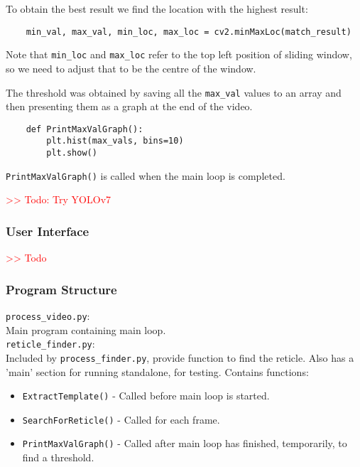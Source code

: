 \documentclass[final]{cmpreport_02}
\begin{document}
To obtain the best result we find the location with the highest result:
\begin{verbatim}
	min_val, max_val, min_loc, max_loc = cv2.minMaxLoc(match_result)
\end{verbatim}

Note that \verb|min_loc| and \verb|max_loc| refer to the top left position of sliding window, so we need to adjust that to be the centre of the window.

The threshold was obtained by saving all the \verb|max_val| values to an array and then presenting them as a graph at the end of the video.
\begin{verbatim}
	def PrintMaxValGraph():
	    plt.hist(max_vals, bins=10)
	    plt.show()
\end{verbatim}
\noindent
\verb|PrintMaxValGraph()| is called when the main loop is completed.

\noindent
\textcolor{red}{>> Todo: Try YOLOv7}

\subsubsection{User Interface}

\textcolor{red}{>> Todo}

\subsubsection{Program Structure}

\verb|process_video.py|:\\
Main program containing main loop.\\

\verb|reticle_finder.py|:\\
Included by \verb|process_finder.py|, provide function to find the reticle. Also has a 'main' section for running standalone, for testing.
Contains functions:
\begin{itemize}
	\item \verb|ExtractTemplate()| - Called before main loop is started.
	\item \verb|SearchForReticle()| - Called for each frame.
	\item \verb|PrintMaxValGraph()| - Called after main loop has finished, temporarily, to find a threshold.
\end{itemize}

\end{document}
